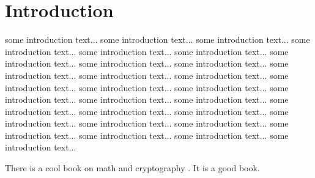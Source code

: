 \chapter{Introduction}

some introduction text...
some introduction text...
some introduction text...
some introduction text...
some introduction text...
some introduction text...
some introduction text...
some introduction text...
some introduction text...
some introduction text...
some introduction text...
some introduction text...
some introduction text...
some introduction text...
some introduction text...
some introduction text...
some introduction text...
some introduction text...
some introduction text...
some introduction text...
some introduction text...
some introduction text...
some introduction text...
some introduction text...
some introduction text...
some introduction text...
some introduction text...
some introduction text...

There is a cool book on math and cryptography \cite{Boneh2015}. It is a good book.